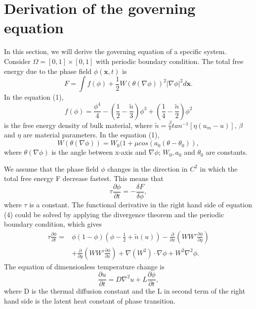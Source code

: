 \documentclass{article}
\begin{document}
    \section{Derivation of the governing equation}
        In this section, we will derive the governing equation of a specific system. Consider $\Omega=[0,1]\times[0,1]$ with periodic boundary condition. The total free energy due to the phase field $\phi(\bm{x},t)$ is
        \begin{equation}
            F=\int f(\phi)+\frac{1}{2}W(\theta(\nabla\phi))^2|\nabla\phi|^2d\bm{x}.
        \end{equation}
        In the equation (1),
        \begin{equation}
            f(\phi)=\frac{\phi^4}{4}-(\frac{1}{2}-\frac{\tilde{n}}{3})\phi^3+(\frac{1}{4}-\frac{\tilde{n}}{2})\phi^2
        \end{equation}
        is the free energy density of bulk material, where $\tilde{n}=\frac{\beta}{\pi}tan^{-1}[\eta(u_m-u)]$, $\beta$ and $\eta$ are material parameters. In the equation (1),
        \begin{equation}
            W(\theta(\nabla\phi))=W_0(1+\mu cos(a_0(\theta-\theta_0)),
        \end{equation}
        where $\theta(\nabla\phi)$ is the angle between x-axis and $\nabla\phi$; $W_0, a_0$ and $ \theta_0$ are constants.
        \par We assume that the phase field $\phi$ changes in the direction in $C^2$ in which the total free energy F decrease fastest. This means that
        \begin{equation}
            \tau\frac{\partial\phi}{\partial t}=-\frac{\delta F}{\delta\phi},
        \end{equation}
        where $\tau$ is a constant. The functional derivative in the right hand side of equation (4) could be solved by applying the divergence theorem and the periodic boundary condition, which gives
        \begin{equation}
            \begin{aligned}
            \tau\frac{\partial \phi}{\partial t}=& \phi(1-\phi)(\phi-\frac{1}{2}+\tilde{n}(u)) - \frac{\partial}{\partial x}(WW'\frac{\partial\phi}{\partial y})\\ 
                                                 & + \frac{\partial}{\partial y}(WW'\frac{\partial\phi}{\partial x}) + \nabla(W^2)\cdot\nabla\phi + W^2\nabla^2\phi. 
            \end{aligned}
        \end{equation}
        The equation of dimensionless temperature change is
        \begin{equation}
            \frac{\partial u}{\partial t}=D\nabla^2u+L\frac{\partial\phi}{\partial t},
        \end{equation}
        where D is the thermal diffusion constant and the L in second term of the right hand side is the latent heat constant of phase transition.
\end{document}
